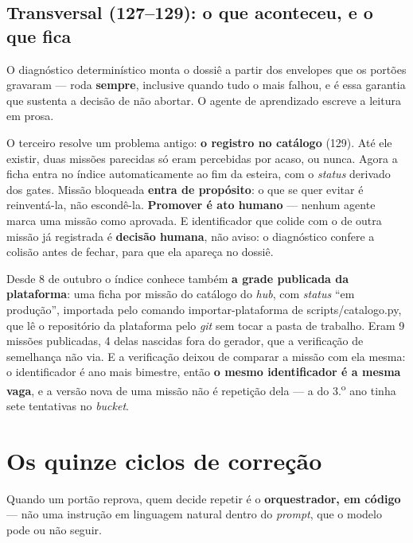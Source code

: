 \documentclass[11pt,a4paper]{article}
\newcommand{\cod}[1]{{\ttfamily\small #1}}
\begin{document}
\subsection{Transversal (127--129): o que aconteceu, e o que fica}

O diagnóstico determinístico monta o dossiê a partir dos envelopes que os portões gravaram --- roda \textbf{sempre}, inclusive quando tudo o mais falhou, e é essa garantia que sustenta a decisão de não abortar. O agente de aprendizado escreve a leitura em prosa.

O terceiro resolve um problema antigo: \textbf{o registro no catálogo} (129). Até ele existir, duas missões parecidas só eram percebidas por acaso, ou nunca. Agora a ficha entra no índice automaticamente ao fim da esteira, com o \emph{status} derivado dos gates. Missão bloqueada \textbf{entra de propósito}: o que se quer evitar é reinventá-la, não escondê-la. \textbf{Promover é ato humano} --- nenhum agente marca uma missão como aprovada. E identificador que colide com o de outra missão já registrada é \textbf{decisão humana}, não aviso: o diagnóstico confere a colisão antes de fechar, para que ela apareça no dossiê.

Desde 8 de outubro o índice conhece também \textbf{a grade publicada da plataforma}: uma ficha por missão do catálogo do \emph{hub}, com \emph{status} ``em produção'', importada pelo comando \cod{importar-\allowbreak plataforma} de \cod{scripts/\allowbreak catalogo.py}, que lê o repositório da plataforma pelo \emph{git} sem tocar a pasta de trabalho. Eram 9 missões publicadas, 4 delas nascidas fora do gerador, que a verificação de semelhança não via. E a verificação deixou de comparar a missão com ela mesma: o identificador é ano mais bimestre, então \textbf{o mesmo identificador é a mesma vaga}, e a versão nova de uma missão não é repetição dela --- a do 3.\textsuperscript{o} ano tinha sete tentativas no \emph{bucket}.

\section{Os quinze ciclos de correção}
\label{sec:ciclos}

Quando um portão reprova, quem decide repetir é o \textbf{orquestrador, em código} --- não uma instrução em linguagem natural dentro do \emph{prompt}, que o modelo pode ou não seguir.
\end{document}
